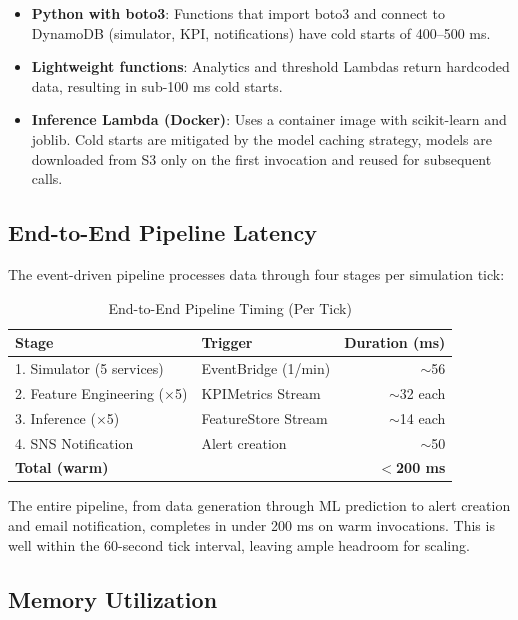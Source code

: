 \documentclass[11pt,a4paper]{article}
\begin{document}
\begin{itemize}[leftmargin=2em]
    \item \textbf{Python with boto3}: Functions that import boto3 and connect to DynamoDB (simulator, KPI, notifications) have cold starts of 400--500 ms.
    \item \textbf{Lightweight functions}: Analytics and threshold Lambdas return hardcoded data, resulting in sub-100 ms cold starts.
    \item \textbf{Inference Lambda (Docker)}: Uses a container image with scikit-learn and joblib. Cold starts are mitigated by the model caching strategy, models are downloaded from S3 only on the first invocation and reused for subsequent calls.
\end{itemize}

\subsection{End-to-End Pipeline Latency}

The event-driven pipeline processes data through four stages per simulation tick:

\begin{table}[H]
\centering
\begin{tabular}{llr}
\toprule
\textbf{Stage} & \textbf{Trigger} & \textbf{Duration (ms)} \\
\midrule
1. Simulator (5 services) & EventBridge (1/min) & $\sim$56 \\
2. Feature Engineering ($\times$5) & KPIMetrics Stream & $\sim$32 each \\
3. Inference ($\times$5) & FeatureStore Stream & $\sim$14 each \\
4. SNS Notification & Alert creation & $\sim$50 \\
\midrule
\textbf{Total (warm)} & & \textbf{$<$200 ms} \\
\bottomrule
\end{tabular}
\caption{End-to-End Pipeline Timing (Per Tick)}
\label{tab:pipeline-timing}
\end{table}

The entire pipeline, from data generation through ML prediction to alert creation and email notification, completes in under 200 ms on warm invocations. This is well within the 60-second tick interval, leaving ample headroom for scaling.

\subsection{Memory Utilization}
\end{document}
